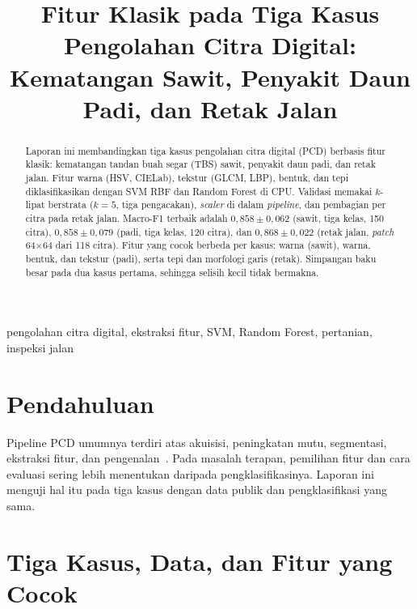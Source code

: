 \documentclass[conference]{IEEEtran}
\begin{document}
\title{Fitur Klasik pada Tiga Kasus Pengolahan Citra Digital: Kematangan Sawit, Penyakit Daun Padi, dan Retak Jalan}

\author{
}

\maketitle

\begin{abstract}
Laporan ini membandingkan tiga kasus pengolahan citra digital (PCD) berbasis
fitur klasik: kematangan tandan buah segar (TBS) sawit, penyakit daun padi, dan
retak jalan. Fitur warna (HSV, CIELab), tekstur (GLCM, LBP), bentuk, dan tepi
diklasifikasikan dengan SVM RBF dan Random Forest di CPU. Validasi memakai
$k$-lipat berstrata ($k=5$, tiga pengacakan), \emph{scaler} di dalam
\emph{pipeline}, dan pembagian per citra pada retak jalan. Macro-F1
terbaik adalah $0{,}858\pm0{,}062$ (sawit, tiga kelas, 150 citra),
$0{,}858\pm0{,}079$ (padi, tiga kelas, 120 citra), dan $0{,}868\pm0{,}022$
(retak jalan, \emph{patch} 64$\times$64 dari 118 citra). Fitur yang cocok berbeda per kasus: warna (sawit), warna, bentuk, dan
tekstur (padi), serta tepi dan morfologi garis (retak). Simpangan baku besar
pada dua kasus pertama, sehingga selisih kecil tidak bermakna.
\end{abstract}

\begin{IEEEkeywords}
pengolahan citra digital, ekstraksi fitur, SVM, Random Forest, pertanian, inspeksi jalan
\end{IEEEkeywords}

\section{Pendahuluan}
Pipeline PCD umumnya terdiri atas akuisisi, peningkatan mutu, segmentasi,
ekstraksi fitur, dan pengenalan~\cite{gonzalez2018}. Pada masalah terapan,
pemilihan fitur dan cara evaluasi sering lebih menentukan daripada
pengklasifikasinya. Laporan ini menguji hal itu pada tiga kasus dengan data
publik dan pengklasifikasi yang sama.

\section{Tiga Kasus, Data, dan Fitur yang Cocok}
\end{document}
